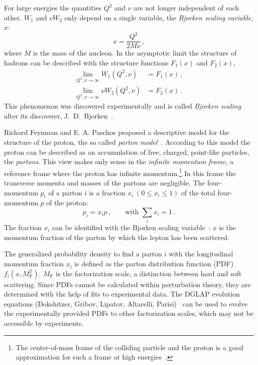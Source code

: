 For large energies the quantities $Q^2$ and $\nu$ are not longer independent of each other.
$W_1$ and $\nu W_2$ only depend on a single variable, the \emph{Bjorken scaling variable}, $x$:
\begin{equation}
    x = \frac{Q^2}{2 M \nu} \,,
\end{equation}
where $M$ is the mass of the nucleon.
In the asymptotic limit the structure of hadrons can be described with the structure functions $F_1(x)$ and $F_2(x)$,
\begin{equation}
    \begin{split}
        \lim_{Q^2, \nu \to \infty} W_1(Q^2, \nu) &= F_1(x) \,, \\
        \lim_{Q^2, \nu \to \infty} \nu W_2(Q^2, \nu) &= F_2(x) \,.
    \end{split}
\end{equation}
This phenomenon was discovered experimentally and is called \emph{Bjorken scaling} after its discoverer, J.\ D.\ Bjorken~\cite{bjo:scaling}.

Richard Feynman and E. A. Paschos proposed a descriptive model for the structure of the proton, the so called
\emph{parton model}~\cite{feyn69,bjo:epscattering}.
According to this model the proton can be described as an accumulation of free, charged, point-like particles, the \emph{partons}.
This view makes only sense in the \emph{infinite momentum frame}, a reference frame where the proton has infinite
momentum.\footnote{The center-of-mass frame of the colliding particle and the proton is a good approximation
for such a frame at high energies~\cite{bjo:epscattering}.}
In this frame the transverse momenta and masses of the partons are negligible.
The four-momentum $p_i$ of a parton $i$ is a fraction $x_i \ (0 \leq x_i \leq 1)$ of the total four-momentum $p$ of the proton:
\begin{equation}
    p_i = x_i p\,, \qquad\text{with } \sum_i x_i = 1\,.
\end{equation}
The fraction $x_i$ can be identified with the Bjorken scaling variable~\cite{bjo:epscattering}: $x$ is the momentum fraction of the parton
by which the lepton has been scattered.

The generalized probability density to find a parton $i$ with the longitudinal momentum fraction $x_i$ is defined as the
parton distribution function (PDF) $f_i(x, M_\text{F}^2)$.
$M_\text{F}$ is the factorization scale, a distinction between hard and soft scattering.
Since PDFs cannot be calculated within perturbation theory, they are determined with the help of fits to experimental data.
The DGLAP evolution equations (Dokshitzer, Gribov, Lipatov, Altarelli, Parisi)~\cite{dglap:d, dglap:gl, dglap:ap}
can be used to evolve the experimentally provided PDFs to other factorization scales, which may not be accessible by experiments.

